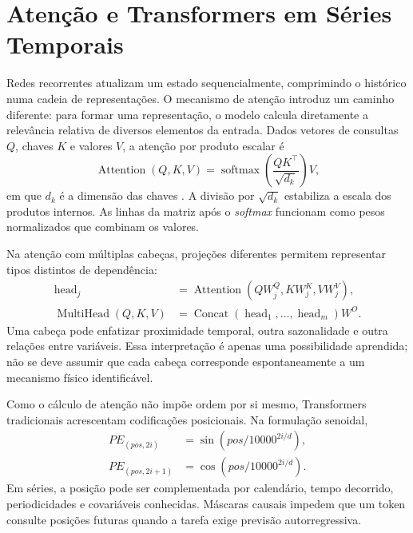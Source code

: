 \section{Atenção e Transformers em Séries Temporais}\label{sec:transformers_series}

Redes recorrentes atualizam um estado sequencialmente, comprimindo o histórico numa cadeia de representações. O mecanismo de atenção introduz um caminho diferente: para formar uma representação, o modelo calcula diretamente a relevância relativa de diversos elementos da entrada. Dados vetores de consultas $Q$, chaves $K$ e valores $V$, a atenção por produto escalar é
\begin{equation}
    \operatorname{Attention}(Q,K,V)
    =\operatorname{softmax}\!\left(\frac{QK^{\top}}{\sqrt{d_k}}\right)V,
    \label{eq:scaled_attention}
\end{equation}
em que $d_k$ é a dimensão das chaves \cite{vaswani2017attention}. A divisão por $\sqrt{d_k}$ estabiliza a escala dos produtos internos. As linhas da matriz após o \textit{softmax} funcionam como pesos normalizados que combinam os valores.

Na atenção com múltiplas cabeças, projeções diferentes permitem representar tipos distintos de dependência:
\begin{align}
    \operatorname{head}_j
    &=\operatorname{Attention}(QW_j^Q,KW_j^K,VW_j^V),\\
    \operatorname{MultiHead}(Q,K,V)
    &=\operatorname{Concat}(\operatorname{head}_1,\ldots,
    \operatorname{head}_m)W^O.
\end{align}
Uma cabeça pode enfatizar proximidade temporal, outra sazonalidade e outra relações entre variáveis. Essa interpretação é apenas uma possibilidade aprendida; não se deve assumir que cada cabeça corresponde espontaneamente a um mecanismo físico identificável.

Como o cálculo de atenção não impõe ordem por si mesmo, Transformers tradicionais acrescentam codificações posicionais. Na formulação senoidal,
\begin{align}
PE_{(pos,2i)}&=\sin\left(pos/10000^{2i/d}\right),\\
PE_{(pos,2i+1)}&=\cos\left(pos/10000^{2i/d}\right).
\end{align}
Em séries, a posição pode ser complementada por calendário, tempo decorrido, periodicidades e covariáveis conhecidas. Máscaras causais impedem que um token consulte posições futuras quando a tarefa exige previsão autorregressiva.

